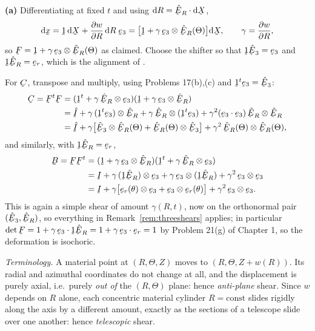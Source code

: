 \begin{solution}
\textbf{(a)} Differentiating at fixed $t$ and using
$\dl R=\ip{\hER}{\dl\bX}$,
\[
   \dl\bx=\shift\,\dl\bX+\frac{\partial w}{\partial R}\,\dl R\;\be_{3}
   =\big[\shift+\gamma\,\be_{3}\otimes\hER(\Theta)\big]\dl\bX ,
   \qquad \gamma=\frac{\partial w}{\partial R},
\]
so $\bF=\shift+\gamma\,\be_{3}\otimes\hER(\Theta)$ as claimed. Choose the
shifter so that $\shift\hbE_{3}=\be_{3}$ and $\shift\hER=\ber$, which is
the alignment of .

For $\bC$, transpose and multiply, using Problems 17(b),(c) and
$\shift^{t}\be_{3}=\hbE_{3}$:
\[
\begin{aligned}
   \bC=\bF^{t}\bF
   &=(\shift^{t}+\gamma\,\hER\otimes\be_{3})
     (\shift+\gamma\,\be_{3}\otimes\hER)\\
   &=\hI+\gamma\,(\shift^{t}\be_{3})\otimes\hER
     +\gamma\,\hER\otimes(\shift^{t}\be_{3})
     +\gamma^{2}(\ip{\be_{3}}{\be_{3}})\,\hER\otimes\hER\\
   &=\hI+\gamma\big[\hbE_{3}\otimes\hER(\Theta)
     +\hER(\Theta)\otimes\hbE_{3}\big]
     +\gamma^{2}\,\hER(\Theta)\otimes\hER(\Theta),
\end{aligned}
\]
and similarly, with $\shift\hER=\ber$,
\[
\begin{aligned}
   \bB=\bF\bF^{t}
   &=(\shift+\gamma\,\be_{3}\otimes\hER)
     (\shift^{t}+\gamma\,\hER\otimes\be_{3})\\
   &=\I+\gamma\,(\shift\hER)\otimes\be_{3}
     +\gamma\,\be_{3}\otimes(\shift\hER)
     +\gamma^{2}\,\be_{3}\otimes\be_{3}\\
   &=\I+\gamma\big[\ber(\theta)\otimes\be_{3}
     +\be_{3}\otimes\ber(\theta)\big]+\gamma^{2}\,\be_{3}\otimes\be_{3}.
\end{aligned}
\]
This is again a simple shear of amount $\gamma(R,t)$, now on the
orthonormal pair $(\hbE_{3},\hER)$, so everything in
Remark~\ref{rem:threeshears} applies; in particular
$\det\bF=1+\gamma\,\ip{\be_{3}}{\shift\hER}=1+\gamma\,\ip{\be_{3}}{\ber}
=1$ by Problem 21(g) of Chapter 1, so the deformation is isochoric.

\emph{Terminology.} A material point at $(R,\Theta,Z)$ moves to
$(R,\Theta,Z+w(R))$. Its radial and azimuthal coordinates do not change at
all, and the displacement is purely axial, i.e.\ purely \emph{out of} the
$(R,\Theta)$ plane: hence \emph{anti-plane} shear. Since $w$ depends on
$R$ alone, each concentric material cylinder $R=\text{const}$ slides
rigidly along the axis by a different amount, exactly as the sections of
a telescope slide over one another: hence \emph{telescopic} shear.


\end{solution}
